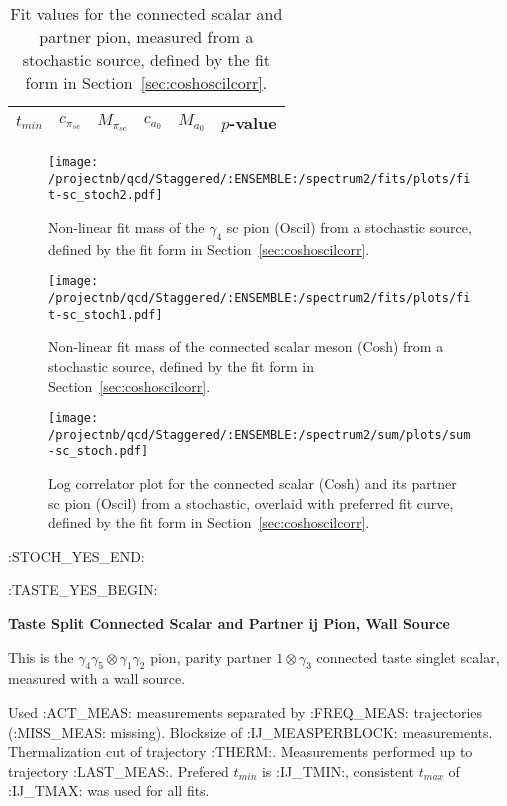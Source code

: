 \begin{table}[ht!]
\centering
\scriptsize
\begin{tabular}{|c|c|c|c|c|c|}
\hline
 $t_{min}$ & $c_{\pi_{sc}}$ &  $M_{\pi_{sc}}$ & $c_{a_0}$ & $M_{a_0}$ & $p$-value \\
\hline

\end{tabular}
\caption{Fit values for the connected scalar and partner pion, measured from a stochastic source, defined by the fit form in Section~\ref{sec:coshoscilcorr}.}
\end{table}


\begin{multicols}{2}
\begin{figure}[H]
\centering
\texttt{[image: /projectnb/qcd/Staggered/:ENSEMBLE:/spectrum2/fits/plots/fit-sc\_stoch2.pdf]}
\caption{Non-linear fit mass of the $\gamma_4$ sc pion (Oscil) from a stochastic source, defined by the fit form in Section~\ref{sec:coshoscilcorr}.}
\end{figure}
\columnbreak
\begin{figure}[H]
\centering
\texttt{[image: /projectnb/qcd/Staggered/:ENSEMBLE:/spectrum2/fits/plots/fit-sc\_stoch1.pdf]}
\caption{Non-linear fit mass of the connected scalar meson (Cosh) from a stochastic source, defined by the fit form in Section~\ref{sec:coshoscilcorr}.}
\end{figure}
\end{multicols}

\begin{figure}[H]
\centering
\texttt{[image: /projectnb/qcd/Staggered/:ENSEMBLE:/spectrum2/sum/plots/sum-sc\_stoch.pdf]}
\caption{Log correlator plot for the connected scalar (Cosh) and its partner sc pion (Oscil) from a stochastic, overlaid with preferred fit curve, defined by the fit form in Section~\ref{sec:coshoscilcorr}.}
\end{figure}

\clearpage
:STOCH_YES_END:

:TASTE_YES_BEGIN:
\centerline{\textbf{Taste Split Connected Scalar and Partner ij Pion, Wall Source}}

This is the $\gamma_4 \gamma_5 \otimes \gamma_1 \gamma_2$ pion, parity partner $1 \otimes \gamma_3$ connected taste singlet scalar, measured with a wall source. 

{\small{Used :ACT_MEAS: measurements separated by :FREQ_MEAS: trajectories (:MISS_MEAS: missing). Blocksize of :IJ_MEASPERBLOCK: measurements. Thermalization cut of trajectory :THERM:. Measurements performed up to trajectory :LAST_MEAS:. Prefered $t_{min}$ is :IJ_TMIN:, consistent $t_{max}$ of :IJ_TMAX: was used for all fits.}}

